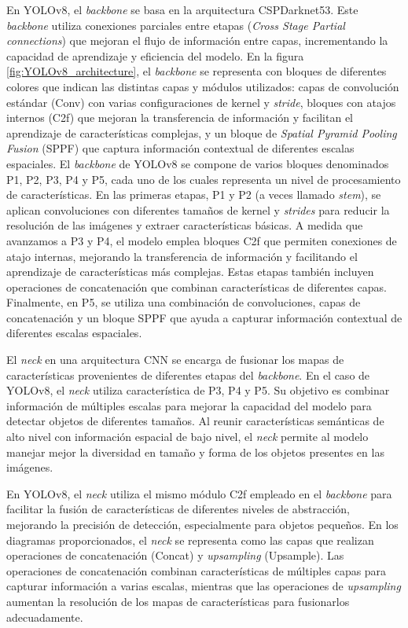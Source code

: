 En YOLOv8, el \textit{backbone} se basa en la arquitectura CSPDarknet53. Este \textit{backbone} utiliza conexiones parciales entre etapas (\textit{Cross Stage Partial connections}) que mejoran el flujo de información entre capas, incrementando la capacidad de aprendizaje y eficiencia del modelo. En la figura \ref{fig:YOLOv8_architecture}, el \textit{backbone} se representa con bloques de diferentes colores que indican las distintas capas y módulos utilizados: capas de convolución estándar (Conv) con varias configuraciones de kernel y \textit{stride}, bloques con atajos internos (C2f) que mejoran la transferencia de información y facilitan el aprendizaje de características complejas, y un bloque de \textit{Spatial Pyramid Pooling Fusion} (SPPF) que captura información contextual de diferentes escalas espaciales. El \textit{backbone} de YOLOv8 se compone de varios bloques denominados P1, P2, P3, P4 y P5, cada uno de los cuales representa un nivel de procesamiento de características. En las primeras etapas, P1 y P2 (a veces llamado \textit{stem}), se aplican convoluciones con diferentes tamaños de kernel y \textit{strides} para reducir la resolución de las imágenes y extraer características básicas. A medida que avanzamos a P3 y P4, el modelo emplea bloques C2f que permiten conexiones de atajo internas, mejorando la transferencia de información y facilitando el aprendizaje de características más complejas.  Estas etapas también incluyen operaciones de concatenación que combinan características de diferentes capas. Finalmente, en P5, se utiliza una combinación de convoluciones, capas de concatenación y un bloque SPPF que ayuda a capturar información contextual de diferentes escalas espaciales.

El \textit{neck} en una arquitectura CNN se encarga de fusionar los mapas de características provenientes de diferentes etapas del \textit{backbone}. En el caso de YOLOv8, el \textit{neck} utiliza característica de P3, P4 y P5. Su objetivo es combinar información de múltiples escalas para mejorar la capacidad del modelo para detectar objetos de diferentes tamaños. Al reunir características semánticas de alto nivel con información espacial de bajo nivel, el \textit{neck} permite al modelo manejar mejor la diversidad en tamaño y forma de los objetos presentes en las imágenes.

En YOLOv8, el \textit{neck} utiliza el mismo módulo C2f empleado en el \textit{backbone} para facilitar la fusión de características de diferentes niveles de abstracción, mejorando la precisión de detección, especialmente para objetos pequeños. En los diagramas proporcionados, el \textit{neck} se representa como las capas que realizan operaciones de concatenación (Concat) y \textit{upsampling} (Upsample). Las operaciones de concatenación combinan características de múltiples capas para capturar información a varias escalas, mientras que las operaciones de \textit{upsampling} aumentan la resolución de los mapas de características para fusionarlos adecuadamente.

